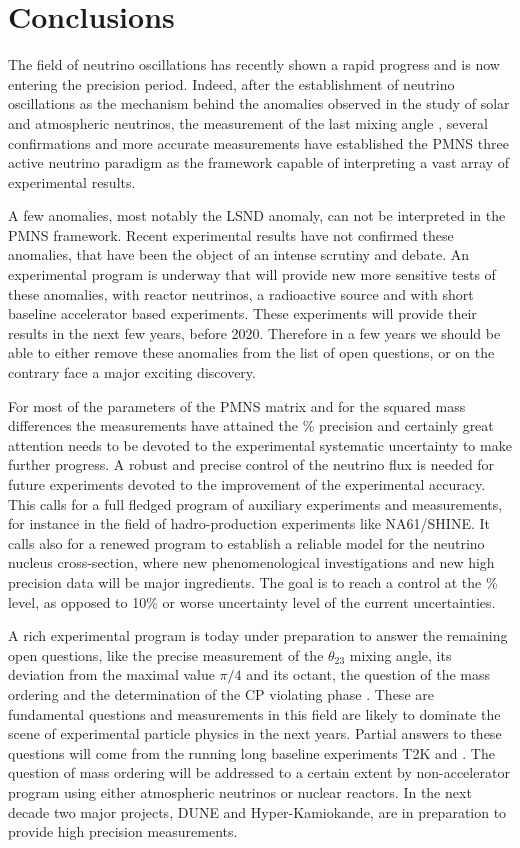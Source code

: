 \section{Conclusions}
\label{sec:conc}

The field of neutrino oscillations has recently shown a rapid progress and is now entering the precision period. Indeed, after the establishment of neutrino oscillations as the mechanism behind the anomalies observed in the study of solar and atmospheric neutrinos, the measurement of the last mixing angle \thint, several confirmations and more accurate measurements have established the PMNS three active neutrino paradigm as the framework capable of interpreting a vast array of experimental results. 

A few anomalies, most notably the LSND anomaly, can not be interpreted in the PMNS framework. Recent experimental results have not confirmed these anomalies, that have been the object of an intense scrutiny and debate. An experimental program is underway that will provide new more sensitive tests of these anomalies, with reactor neutrinos, a radioactive source and with short baseline accelerator based experiments. These experiments will provide their results in the next few years, before 2020. Therefore in a few years we should be able to either remove these anomalies from the list of open questions, or on the contrary face a major exciting discovery.  

For most of the parameters of the PMNS matrix and for the squared mass differences the measurements have attained the \% precision and certainly great attention needs to be devoted to the experimental systematic uncertainty to make further progress. A robust and precise control of the neutrino flux is needed for future experiments devoted to the improvement of the experimental accuracy. This calls for a full fledged program of auxiliary experiments and measurements, for instance in the field of hadro-production experiments like NA61/SHINE. It calls also for a renewed program to establish a reliable model for the neutrino nucleus cross-section, where new phenomenological investigations and new high precision data will be major ingredients. The goal is to reach a control at the \% level, as opposed to 10\% or worse uncertainty level of the current uncertainties.

A rich experimental program is today under preparation to answer the remaining open questions, like the precise measurement of the $\theta_{23}$ mixing angle, its deviation from the maximal value $\pi/4$ and its octant, the question of the mass ordering and the determination of the CP violating phase \dcp. These are fundamental questions and measurements in this field are likely to dominate the scene of experimental particle physics in the next years. Partial answers to these questions will come from the running long baseline experiments T2K and \nova.
The question of mass ordering will be addressed to a certain extent by non-accelerator program using either atmospheric neutrinos or nuclear reactors. 
In the next decade two major projects, DUNE and Hyper-Kamiokande, are in preparation to provide high precision measurements. 







